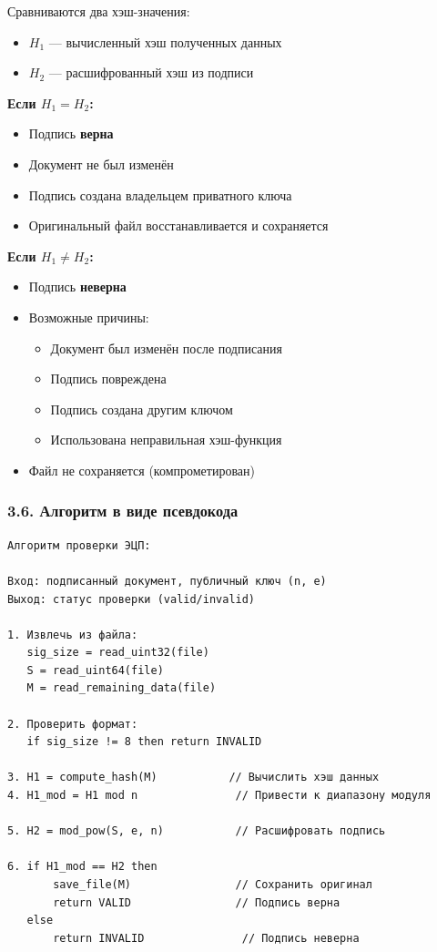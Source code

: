 Сравниваются два хэш-значения:
\begin{itemize}
    \item $H_1$ — вычисленный хэш полученных данных
    \item $H_2$ — расшифрованный хэш из подписи
\end{itemize}

\textbf{Если $H_1 = H_2$:}
\begin{itemize}
    \item Подпись \textbf{верна}
    \item Документ не был изменён
    \item Подпись создана владельцем приватного ключа
    \item Оригинальный файл восстанавливается и сохраняется
\end{itemize}

\textbf{Если $H_1 \neq H_2$:}
\begin{itemize}
    \item Подпись \textbf{неверна}
    \item Возможные причины:
    \begin{itemize}
        \item Документ был изменён после подписания
        \item Подпись повреждена
        \item Подпись создана другим ключом
        \item Использована неправильная хэш-функция
    \end{itemize}
    \item Файл не сохраняется (компрометирован)
\end{itemize}

\subsubsection*{3.6. Алгоритм в виде псевдокода}

\begin{verbatim}
Алгоритм проверки ЭЦП:

Вход: подписанный документ, публичный ключ (n, e)
Выход: статус проверки (valid/invalid)

1. Извлечь из файла:
   sig_size = read_uint32(file)
   S = read_uint64(file)
   M = read_remaining_data(file)

2. Проверить формат:
   if sig_size != 8 then return INVALID

3. H1 = compute_hash(M)           // Вычислить хэш данных
4. H1_mod = H1 mod n               // Привести к диапазону модуля

5. H2 = mod_pow(S, e, n)           // Расшифровать подпись

6. if H1_mod == H2 then
       save_file(M)                // Сохранить оригинал
       return VALID                // Подпись верна
   else
       return INVALID               // Подпись неверна
\end{verbatim}

